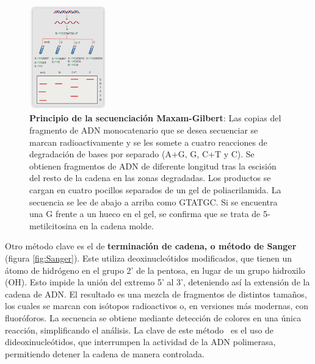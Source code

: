 \begin{figure}[htbp]
\centering
\includegraphics[width = 0.3\textwidth]{figs/maxam-gilbert.png}
\caption{\textbf{Principio de la secuenciación Maxam-Gilbert}: Las copias del fragmento de ADN monocatenario que se desea secuenciar se marcan radioactivamente y se les somete a cuatro reacciones de degradación de bases por separado (A+G, G, C+T y C). Se obtienen fragmentos de ADN de diferente longitud tras la escisión del resto de la cadena en las zonas degradadas. Los productos se cargan en cuatro pocillos separados de un gel de poliacrilamida. La secuencia se lee de abajo a arriba como GTATGC. Si se encuentra una G frente a un hueco en el gel, se confirma que se trata de 5-metilcitosina en la cadena molde.}
\label{fig:MaxamGilbert}
\end{figure}

Otro método clave es el de \textbf{terminación de cadena, o método de Sanger} (figura \ref{fig:Sanger}). Este utiliza deoxinucleótidos modificados, que tienen un átomo de hidrógeno en el grupo 2' de la pentosa, en lugar de un grupo hidroxilo (OH). Esto impide la unión del extremo 5' al 3', deteniendo así la extensión de la cadena de ADN. El resultado es una mezcla de fragmentos de distintos tamaños, los cuales se marcan con isótopos radioactivos o, en versiones más modernas, con fluoróforos. La secuencia se obtiene mediante detección de colores en una única reacción, simplificando el análisis. La clave de este método  \ es el uso de dideoxinucleótidos, que interrumpen la actividad de la ADN polimerasa, permitiendo detener la cadena de manera controlada.

